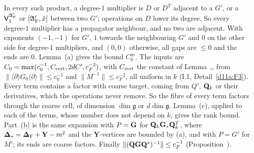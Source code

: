 \begin{detail}
\begin{step}
\end{step}
\begin{step}
In every such product, a degree-$1$ multiplier is $D$ or $D^T$ adjacent to a $G'$, or a $\mathsf V_1^{\mathfrak A'_{\rm F}}$ or $[\mathfrak A'_{\rm F},\hat x]$ between two $G'$; operations on $D$ lower its degree. So every degree-$1$ multiplier has a propagator neighbour, and no two are adjacent. With exponents $(-1,-1)$ for $G'$, $1$ towards the neighbouring $G'$ and $0$ on the other side for degree-$1$ multipliers, and $(0,0)$ otherwise, all gaps are $\le0$ and the ends are $0$. Lemma~(a) gives the bound $C_0^m$. The inputs are $C_0=\max(c_0^{-1},C_{\rm vert},2dC',c_F^{-2})$, with $C_{\rm vert}$ the constant of Lemma~,, from $\|\langle\partial\rangle G_0\langle\partial\rangle\|\le c_0^{-1}$ and $\|M^{-1}\|\le c_F^{-2}$, all uniform in $k$ (I.1, Detail~\ref{d11a:F3}). Every term contains a factor with coarse target, coming from $Q'$, $\mathbf Q_k$ or their derivatives, which the operations never remove. So the fibre of every term factors through the coarse cell, of dimension $\dim\mathfrak g$ or $d\dim\mathfrak g$. Lemma~(c), applied to each of the terms, whose number does not depend on $k$, gives the rank bound. Part~(b) is the same expansion with $P=\mathbf G$ for $\mathbf Q_k\mathbf G_*\mathbf Q_k^T$, where $\boldsymbol{\Delta}_*=\boldsymbol{\Delta}_{\rm F}+\mathbf Y-m^2$ and the $\mathbf Y$-vertices are bounded by (a), and with $P=G'$ for $M'$; its ends are coarse factors. Finally $\|(\mathbf Q\mathbf G\mathbf Q^*)^{-1}\|\le c_F^{-1}$ (Proposition~).
\end{step}
\end{detail}

